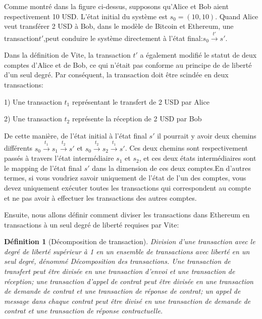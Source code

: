\documentclass[UTF8,nofonts]{article}
\newtheorem{definition}{Définition}[section]
\begin{document}
\begin{multicols}{2}
Comme montré dans la figure ci-dessus, supposons qu'Alice et Bob aient respectivement 10 USD. L'état initial du système est $s_{0} = (10, 10)$. Quand Alice veut transférer 2 USD à Bob, dans le modèle de Bitcoin et Ethereum, une transaction${t}'$,peut conduire le système directement à l'état final:$s_{0} \overset{{t}'}{\rightarrow}{s}'$.

Dans la définition de Vite, la transaction ${t}'$ a également modifié le statut de deux comptes d'Alice et de Bob, ce qui n'était pas conforme au principe de de liberté d'un seul degré. Par conséquent, la transaction doit être scindée en deux transactions:

1) Une transaction $t_{1}$ représentant le transfert de 2 USD par Alice

2) Une transaction $t_{2}$ représente la réception de 2 USD par Bob 

De cette manière, de l'état initial à l'état final ${s}'$ il pourrait y avoir deux chemins différents $s_{0} \overset{t_{1}}{\rightarrow} s_{1} \overset{t_{2}}{\rightarrow} {s}'$ et $s_{0} \overset{t_{2}}{\rightarrow} s_{2} \overset{t_{1}}{\rightarrow} {s}'$. Ces deux chemins sont respectivement passés à travers l'état intermédiaire $s_{1}$ et $s_{2}$, et ces deux états intermédiaires sont le mapping de l'état final ${s}'$ dans la dimension de ces deux comptes.En d'autres termes, si vous voudriez savoir uniquement de l'état de l'un des comptes, vous devez uniquement exécuter toutes les transactions qui correspondent au compte et ne pas avoir à effectuer les transactions des autres comptes.

Ensuite, nous allons définir comment diviser les transactions dans Ethereum en transactions à un seul degré de liberté requises par Vite:
\begin{definition}[Décomposition de transaction]
Division d'une transaction avec le degré de liberté supérieur à 1 en un ensemble de transactions avec liberté en un seul degré, dénommé Décomposition des transactions. Une transaction de transfert peut être divisée en une transaction d'envoi et une transaction de réception; une transaction d'appel de contrat peut être divisée en une transaction de demande de contrat et une transaction de réponse de contrat; un appel de message dans chaque contrat peut être divisé en une transaction de demande de contrat et une transaction de réponse contractuelle.
\end{definition}


\end{multicols}
\end{document}
